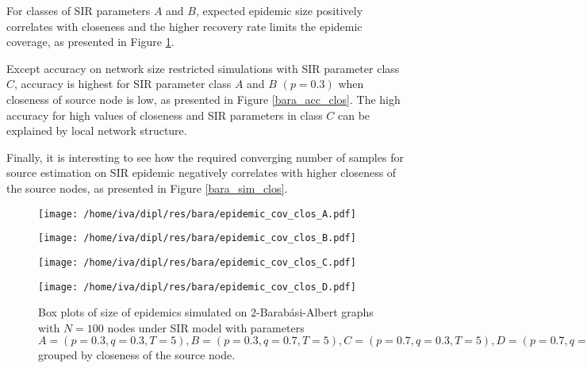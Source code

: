 \documentclass[times, utf8, diplomski]{fer}
\begin{document}
For classes of SIR parameters $A$ and $B$, expected epidemic size positively correlates with closeness and the higher recovery rate limits the epidemic coverage, as presented in Figure \ref{bara_cov_clos}. 

Except accuracy on network size restricted simulations with SIR parameter class $C$, accuracy is highest for SIR parameter class $A$ and $B$ $(p = 0.3)$ when closeness of source node is low, as presented in Figure \ref{bara_acc_clos}.  The high accuracy for high values of closeness and SIR parameters in class $C$ can be explained by local network structure. 

Finally, it is interesting to see how the required converging number of samples for source estimation on SIR epidemic negatively correlates with higher closeness of the source nodes, as presented in Figure \ref{bara_sim_clos}. 

\begin{figure}[H]
\begin{minipage}{\textwidth}
\begin{minipage}{0.5\textwidth}
\texttt{[image: /home/iva/dipl/res/bara/epidemic\_cov\_clos\_A.pdf]}
\end{minipage}
\begin{minipage}{0.5\textwidth}
\texttt{[image: /home/iva/dipl/res/bara/epidemic\_cov\_clos\_B.pdf]}
\end{minipage}
\begin{minipage}{0.5\textwidth}
\texttt{[image: /home/iva/dipl/res/bara/epidemic\_cov\_clos\_C.pdf]}
\end{minipage}
\begin{minipage}{0.5\textwidth}
\texttt{[image: /home/iva/dipl/res/bara/epidemic\_cov\_clos\_D.pdf]}
\end{minipage}
\caption{Box plots of size of epidemics simulated on  $2$-Barab\'{a}si-Albert graphs  with $N=100$ nodes under SIR model with parameters $A = (p=0.3, q=0.3, T=5), B = (p=0.3, q=0.7, T=5), C = (p=0.7, q=0.3, T=5), D = (p=0.7, q=0.7, T=5)$ grouped by closeness of the source node.}
\label{bara_cov_clos}
\end{minipage}
\end{figure}
\end{document}
